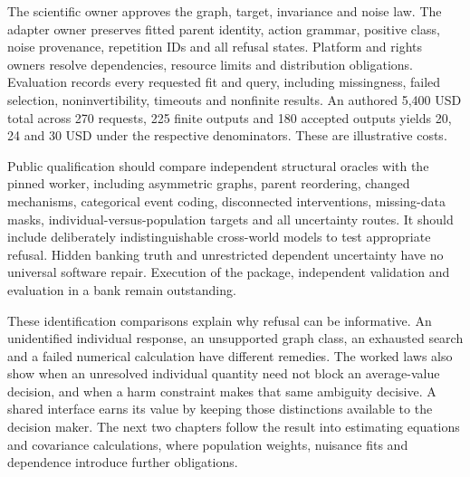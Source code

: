 The scientific owner approves the graph, target, invariance and noise law.
The adapter owner preserves fitted parent identity, action grammar,
positive class, noise provenance, repetition IDs and all refusal states.
Platform and rights owners resolve dependencies, resource limits and
distribution obligations. Evaluation records every requested fit and query,
including missingness, failed selection, noninvertibility, timeouts and
nonfinite results. An authored 5,400 USD total across 270 requests,
225 finite outputs and 180 accepted outputs yields 20, 24 and 30 USD
under the respective denominators. These are illustrative costs.
\citep{exec24_gcm_choice}

Public qualification should compare independent structural oracles with
the pinned worker, including asymmetric graphs, parent reordering,
changed mechanisms, categorical event coding, disconnected interventions,
missing-data masks, individual-versus-population targets and all uncertainty
routes. It should include deliberately indistinguishable cross-world models
to test appropriate refusal. Hidden banking truth and unrestricted dependent
uncertainty have no universal software repair. Execution of the package, independent validation and evaluation in a bank remain outstanding.~\citep{exec24_gcm_choice}


These identification comparisons explain why refusal can be informative.
An unidentified individual response, an unsupported graph class, an exhausted
search and a failed numerical calculation have different remedies. The
worked laws also show when an unresolved individual quantity need not block
an average-value decision, and when a harm constraint makes that same
ambiguity decisive. A shared interface earns its value by keeping those
distinctions available to the decision maker. The next two chapters follow
the result into estimating equations and covariance calculations, where
population weights, nuisance fits and dependence introduce further obligations.

